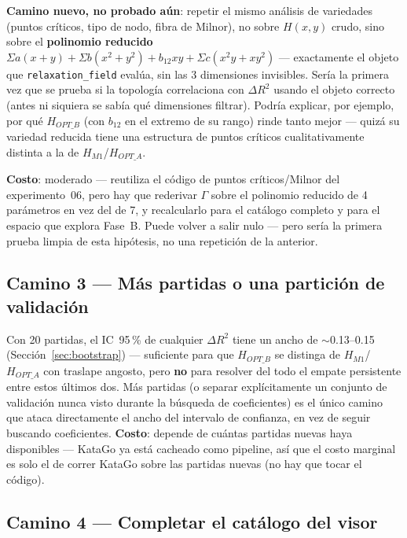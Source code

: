 \documentclass[11pt, a4paper]{article}
\begin{document}
\begin{tcolorbox}[quotebox]
  \textbf{Camino nuevo, no probado a\'un}: repetir el mismo an\'alisis
  de variedades (puntos cr\'iticos, tipo de nodo, fibra de Milnor), no
  sobre $H(x,y)$ crudo, sino sobre el \textbf{polinomio reducido}
  $\Sigma a(x{+}y)+\Sigma b(x^2{+}y^2)+b_{12}xy+\Sigma c(x^2y{+}xy^2)$
  --- exactamente el objeto que \texttt{relaxation\_field} eval\'ua, sin
  las 3 dimensiones invisibles. Ser\'ia la primera vez que se prueba si
  la topolog\'ia correlaciona con $\Delta R^2$ usando el objeto correcto
  (antes ni siquiera se sab\'ia qu\'e dimensiones filtrar). Podr\'ia
  explicar, por ejemplo, por qu\'e $H_{OPT\_B}$ (con $b_{12}$ en el
  extremo de su rango) rinde tanto mejor --- quiz\'a su variedad
  reducida tiene una estructura de puntos cr\'iticos cualitativamente
  distinta a la de $H_{M1}$/$H_{OPT\_A}$.
\end{tcolorbox}

\textbf{Costo}: moderado --- reutiliza el c\'odigo de puntos
cr\'iticos/Milnor del experimento~06, pero hay que rederivar $\Gamma$
sobre el polinomio reducido de 4 par\'ametros en vez del de 7, y
recalcularlo para el cat\'alogo completo y para el espacio que explora
Fase~B. Puede volver a salir nulo --- pero ser\'ia la primera prueba
limpia de esta hip\'otesis, no una repetici\'on de la anterior.

\subsection{Camino 3 --- M\'as partidas o una partici\'on de validaci\'on}

Con 20 partidas, el IC~95\,\% de cualquier $\Delta R^2$ tiene un ancho
de $\sim$0.13--0.15 (Secci\'on~\ref{sec:bootstrap}) --- suficiente para
que $H_{OPT\_B}$ se distinga de $H_{M1}$/$H_{OPT\_A}$ con traslape
angosto, pero \textbf{no} para resolver del todo el empate persistente
entre estos \'ultimos dos. M\'as partidas (o separar expl\'icitamente
un conjunto de validaci\'on nunca visto durante la b\'usqueda de
coeficientes) es el \'unico camino que ataca directamente el ancho del
intervalo de confianza, en vez de seguir buscando coeficientes.
\textbf{Costo}: depende de cu\'antas partidas nuevas haya disponibles
--- KataGo ya est\'a cacheado como pipeline, as\'i que el costo marginal
es solo el de correr KataGo sobre las partidas nuevas (no hay que
tocar el c\'odigo).

\subsection{Camino 4 --- Completar el cat\'alogo del visor}
\end{document}
